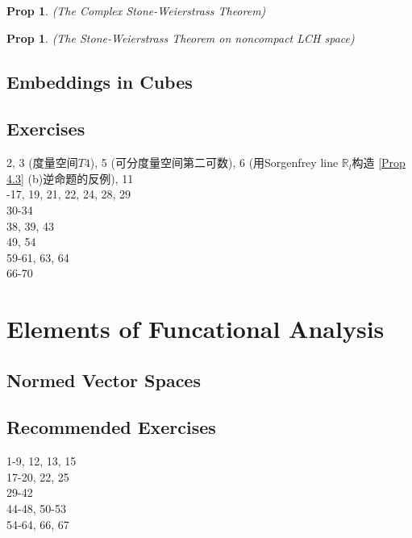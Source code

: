 \documentclass[hidelinks]{article}
\theoremstyle{definition}
\theoremstyle{plain}
\newtheorem{proposition}[theorem]{Prop}
\theoremstyle{remark}
\begin{document}
\begin{proposition} (The Complex Stone-Weierstrass Theorem) \\

\end{proposition}

\begin{proposition} (The Stone-Weierstrass Theorem on noncompact LCH space)

\end{proposition}

\subsection{Embeddings in Cubes}




\subsection{Exercises}
2, 3 (度量空间$T4$), 5 (可分度量空间第二可数), 6 (用Sorgenfrey line $\mathbb{R}_l$构造 \autoref{Prop 4.3} (b)逆命题的反例), 11 \\
-17, 19, 21, 22, 24, 28, 29 \\
30-34 \\
38, 39, 43 \\
49, 54 \\
59-61, 63, 64 \\
66-70 \\
\newpage


\section{Elements of Funcational Analysis}

\subsection{Normed Vector Spaces}










\subsection{Recommended Exercises}
1-9, 12, 13, 15 \\
17-20, 22, 25 \\
29-42 \\
44-48, 50-53 \\
54-64, 66, 67 \\
\end{document}

